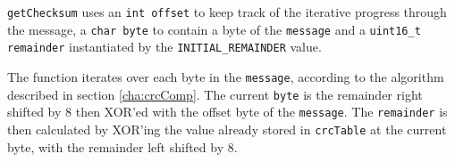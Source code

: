 \texttt{getChecksum} uses an \texttt{int offset} to keep track of the iterative progress through the message, a \texttt{char byte} to contain a byte of the \texttt{message} and a \texttt{uint16\_t remainder} instantiated by the \texttt{INITIAL\_REMAINDER} value. 

The function iterates over each byte in the \texttt{message}, according to the algorithm described in section \ref{cha:crcComp}. The current \texttt{byte} is the remainder right shifted by 8 then XOR'ed with the offset byte of the \texttt{message}. The \texttt{remainder} is then calculated by XOR'ing the value already stored in \texttt{crcTable} at the current byte, with the remainder left shifted by 8.
